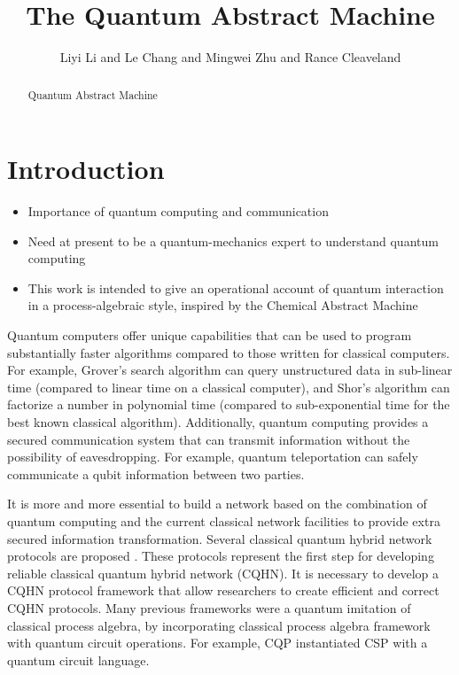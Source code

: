 \documentclass[a4paper,UKenglish,cleveref, autoref, thm-restate]{lipics-v2021}
\title{The Quantum Abstract Machine}
\author{Liyi Li and Le Chang and Mingwei Zhu and Rance Cleaveland}{ }{}{}{}%
\begin{document}
\maketitle

\begin{abstract}
Quantum Abstract Machine
\end{abstract}



\section{Introduction} \label{sec:introduction}

\begin{itemize}
    \item Importance of quantum computing and communication
    \item Need at present to be a quantum-mechanics expert to understand quantum computing
    \item This work is intended to give an operational account of quantum interaction in a process-algebraic style, inspired by the Chemical Abstract Machine
\end{itemize}

Quantum computers offer unique capabilities that can be used to
program substantially faster algorithms compared to those written for
classical computers. For example, Grover's search algorithm \cite{grover1996,grover1997}
can query unstructured data in sub-linear time (compared to linear
time on a classical computer), and Shor's algorithm \cite{shors} can factorize a
number in polynomial time (compared to sub-exponential time for the
best known classical algorithm).
Additionally, quantum computing provides a secured communication system that can transmit
information without the possibility of eavesdropping.
For example, quantum teleportation can safely communicate a qubit information between two parties.

It is more and more essential to build a network based on the combination of quantum computing
and the current classical network facilities to provide extra secured information transformation.
Several classical quantum hybrid network protocols are proposed \cite{10.1145/3387514.3405853,https://doi.org/10.48550/arxiv.2205.08479,8068178,e24101488}.
These protocols represent the first step for developing reliable classical quantum hybrid network (CQHN).
It is necessary to develop a CQHN protocol framework that allow
researchers to create efficient and correct CQHN protocols. 
Many previous frameworks \cite{10.1145/1040305.1040318,9165801} were a quantum imitation of classical process algebra, by incorporating classical process algebra framework with quantum circuit operations.
For example, CQP \cite{10.1145/1040305.1040318} instantiated CSP \cite{Hoare:1985:CSP:3921} with a quantum circuit language.
\end{document}
